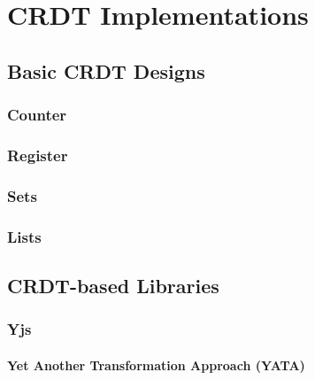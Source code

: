 \chapter{CRDT Implementations}

\section{Basic CRDT Designs}

\subsection{Counter}

\subsection{Register}

\subsection{Sets}

\subsection{Lists}

\section{CRDT-based Libraries}

\subsection{Yjs}

\subsubsection{Yet Another Transformation Approach (YATA)}